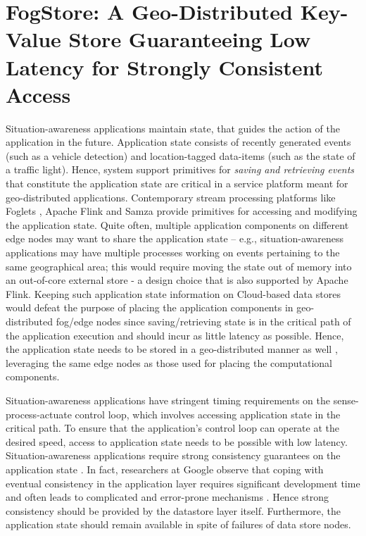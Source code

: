 \chapter{FogStore: A Geo-Distributed Key-Value Store Guaranteeing Low
Latency for Strongly Consistent Access}

Situation-awareness applications maintain state, that guides the action of the application in the future. Application state consists of recently generated events (such as a vehicle detection) and location-tagged data-items (such as the state of a traffic light). Hence, system support primitives for {\it saving and retrieving events} that constitute the application state are critical in a service platform meant for geo-distributed applications. Contemporary stream processing platforms like Foglets \cite{foglets}, Apache Flink \cite{flink} and Samza \cite{samza} provide primitives for accessing and modifying the application state. Quite often, multiple application components on different edge nodes may want to share the application state -- e.g.,  situation-awareness applications may have multiple processes working on events pertaining to the same geographical area; this would require moving the state out of memory into an out-of-core external store \cite{sharedstateflink} - a design choice that is also supported by Apache Flink. Keeping such application state information on Cloud-based data stores would defeat the purpose of placing the application components in geo-distributed fog/edge nodes since saving/retrieving state is in the critical path of the application execution and should incur as little latency as possible. Hence, the application state needs to be stored in a geo-distributed manner as well \cite{confais2017performance}, leveraging the same edge nodes as those used for placing the computational components. 
\par Situation-awareness applications have stringent timing requirements on the sense-process-actuate control loop, which involves accessing application state in the critical path. To ensure that the application's control loop can operate at the desired speed, access to application state needs to be possible with low latency. Situation-awareness applications require strong consistency guarantees on the application state \cite{consistentstreaming}. In fact, researchers at Google observe that coping with eventual consistency in the application layer requires significant development time and often leads to complicated and error-prone mechanisms \cite{f1}. Hence strong consistency should be provided by the datastore layer itself. Furthermore, the application state should remain available in spite of failures of data store nodes.
